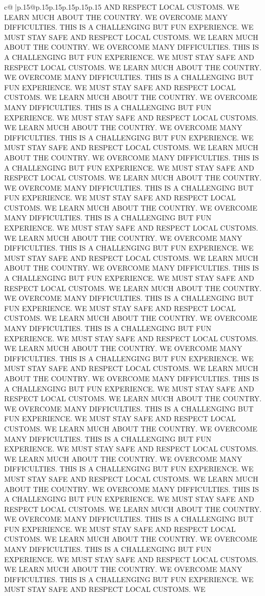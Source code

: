 \documentclass{article}
\begin{document}
{\begin{supertabular}{c@{$\;$}|p{.15\linewidth}@{}p{.15\linewidth}p{.15\linewidth}p{.15\linewidth}p{.15\linewidth}p{.15\linewidth}}
{{{AND RESPECT LOCAL CUSTOMS. WE LEARN MUCH ABOUT THE COUNTRY. WE OVERCOME MANY DIFFICULTIES. THIS IS A CHALLENGING BUT FUN EXPERIENCE. WE MUST STAY SAFE AND RESPECT LOCAL CUSTOMS. WE LEARN MUCH ABOUT THE COUNTRY. WE OVERCOME MANY DIFFICULTIES. THIS IS A CHALLENGING BUT FUN EXPERIENCE. WE MUST STAY SAFE AND RESPECT LOCAL CUSTOMS. WE LEARN MUCH ABOUT THE COUNTRY. WE OVERCOME MANY DIFFICULTIES. THIS IS A CHALLENGING BUT FUN EXPERIENCE. WE MUST STAY SAFE AND RESPECT LOCAL CUSTOMS. WE LEARN MUCH ABOUT THE COUNTRY. WE OVERCOME MANY DIFFICULTIES. THIS IS A CHALLENGING BUT FUN EXPERIENCE. WE MUST STAY SAFE AND RESPECT LOCAL CUSTOMS. WE LEARN MUCH ABOUT THE COUNTRY. WE OVERCOME MANY DIFFICULTIES. THIS IS A CHALLENGING BUT FUN EXPERIENCE. WE MUST STAY SAFE AND RESPECT LOCAL CUSTOMS. WE LEARN MUCH ABOUT THE COUNTRY. WE OVERCOME MANY DIFFICULTIES. THIS IS A CHALLENGING BUT FUN EXPERIENCE. WE MUST STAY SAFE AND RESPECT LOCAL CUSTOMS. WE LEARN MUCH ABOUT THE COUNTRY. WE OVERCOME MANY DIFFICULTIES. THIS IS A CHALLENGING BUT FUN EXPERIENCE. WE MUST STAY SAFE AND RESPECT LOCAL CUSTOMS. WE LEARN MUCH ABOUT THE COUNTRY. WE OVERCOME MANY DIFFICULTIES. THIS IS A CHALLENGING BUT FUN EXPERIENCE. WE MUST STAY SAFE AND RESPECT LOCAL CUSTOMS. WE LEARN MUCH ABOUT THE COUNTRY. WE OVERCOME MANY DIFFICULTIES. THIS IS A CHALLENGING BUT FUN EXPERIENCE. WE MUST STAY SAFE AND RESPECT LOCAL CUSTOMS. WE LEARN MUCH ABOUT THE COUNTRY. WE OVERCOME MANY DIFFICULTIES. THIS IS A CHALLENGING BUT FUN EXPERIENCE. WE MUST STAY SAFE AND RESPECT LOCAL CUSTOMS. WE LEARN MUCH ABOUT THE COUNTRY. WE OVERCOME MANY DIFFICULTIES. THIS IS A CHALLENGING BUT FUN EXPERIENCE. WE MUST STAY SAFE AND RESPECT LOCAL CUSTOMS. WE LEARN MUCH ABOUT THE COUNTRY. WE OVERCOME MANY DIFFICULTIES. THIS IS A CHALLENGING BUT FUN EXPERIENCE. WE MUST STAY SAFE AND RESPECT LOCAL CUSTOMS. WE LEARN MUCH ABOUT THE COUNTRY. WE OVERCOME MANY DIFFICULTIES. THIS IS A CHALLENGING BUT FUN EXPERIENCE. WE MUST STAY SAFE AND RESPECT LOCAL CUSTOMS. WE LEARN MUCH ABOUT THE COUNTRY. WE OVERCOME MANY DIFFICULTIES. THIS IS A CHALLENGING BUT FUN EXPERIENCE. WE MUST STAY SAFE AND RESPECT LOCAL CUSTOMS. WE LEARN MUCH ABOUT THE COUNTRY. WE OVERCOME MANY DIFFICULTIES. THIS IS A CHALLENGING BUT FUN EXPERIENCE. WE MUST STAY SAFE AND RESPECT LOCAL CUSTOMS. WE LEARN MUCH ABOUT THE COUNTRY. WE OVERCOME MANY DIFFICULTIES. THIS IS A CHALLENGING BUT FUN EXPERIENCE. WE MUST STAY SAFE AND RESPECT LOCAL CUSTOMS. WE LEARN MUCH ABOUT THE COUNTRY. WE OVERCOME MANY DIFFICULTIES. THIS IS A CHALLENGING BUT FUN EXPERIENCE. WE MUST STAY SAFE AND RESPECT LOCAL CUSTOMS. WE LEARN MUCH ABOUT THE COUNTRY. WE OVERCOME MANY DIFFICULTIES. THIS IS A CHALLENGING BUT FUN EXPERIENCE. WE MUST STAY SAFE AND RESPECT LOCAL CUSTOMS. WE LEARN MUCH ABOUT THE COUNTRY. WE OVERCOME MANY DIFFICULTIES. THIS IS A CHALLENGING BUT FUN EXPERIENCE. WE MUST STAY SAFE AND RESPECT LOCAL CUSTOMS. WE LEARN MUCH ABOUT THE COUNTRY. WE OVERCOME MANY DIFFICULTIES. THIS IS A CHALLENGING BUT FUN EXPERIENCE. WE MUST STAY SAFE AND RESPECT LOCAL CUSTOMS. WE LEARN MUCH ABOUT THE COUNTRY. WE OVERCOME MANY DIFFICULTIES. THIS IS A CHALLENGING BUT FUN EXPERIENCE. WE MUST STAY SAFE AND RESPECT LOCAL CUSTOMS. WE }}}
\end{supertabular}}
\end{document}
